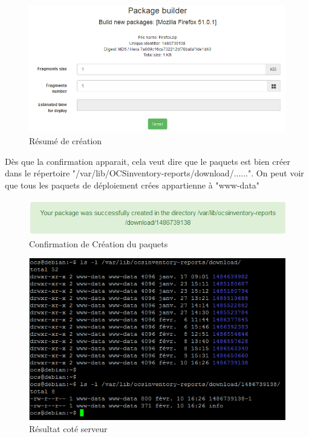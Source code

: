 \documentclass[11pt,a4paper,oneside]{article}
\begin{document}
\begin{figure}[hbtp]
\centering
\includegraphics[scale=0.6]{Script/Deploiement3.PNG}
\caption{Résumé de création}
\end{figure}
\newpage
Dès que la confirmation apparait, cela veut dire que le paquets est bien créer dans le répertoire "/var/lib/OCSinventory-reports/download/......". On peut voir que tous les paquets de déploiement crées appartienne à "www-data"

\begin{figure}[hbtp]
\centering
\includegraphics[scale=0.6]{Script/Deploiement4.PNG}
\caption{Confirmation de Création du paquets}
\end{figure}

\begin{figure}[hbtp]
\centering
\includegraphics[scale=0.7]{Script/Deploiement5.PNG}
\caption{Résultat coté serveur}
\end{figure}
\newpage
\end{document}

